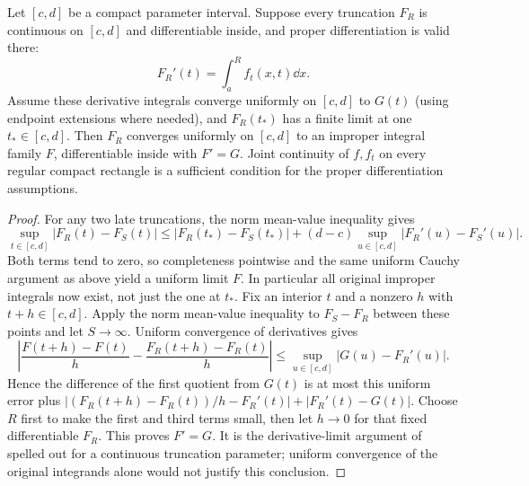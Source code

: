 \begin{theorem}
Let $[c,d]$ be a compact parameter interval. Suppose every truncation
$F_R$ is continuous on $[c,d]$ and differentiable inside, and proper
differentiation is valid there:
\[F_R'(t)=\int_a^R f_t(x,t)\dd x.
\]
Assume these derivative integrals converge uniformly on $[c,d]$ to
$G(t)$ (using endpoint extensions where needed), and $F_R(t_*)$ has a
finite limit at one $t_*\in[c,d]$. Then $F_R$ converges uniformly on
$[c,d]$ to an improper integral family $F$, differentiable inside with
$F'=G$. Joint continuity of $f,f_t$ on every regular compact rectangle
is a sufficient condition for the proper differentiation assumptions.
\end{theorem}
\begin{proof}
For any two late truncations, the norm mean-value inequality gives
\[\sup_{t\in[c,d]}|F_R(t)-F_S(t)|
\le|F_R(t_*)-F_S(t_*)|+(d-c)\sup_{u\in[c,d]}|F_R'(u)-F_S'(u)|.
\]
Both terms tend to zero, so completeness pointwise and the same uniform
Cauchy argument as above yield a uniform limit $F$. In particular all
original improper integrals now exist, not just the one at $t_*$.
Fix an interior $t$ and a nonzero $h$ with $t+h\in[c,d]$.
Apply the norm mean-value inequality to $F_S-F_R$ between these points
and let $S\to\infty$. Uniform convergence of derivatives gives
\[\left|\frac{F(t+h)-F(t)}h-
\frac{F_R(t+h)-F_R(t)}h\right|
\le\sup_{u\in[c,d]}|G(u)-F_R'(u)|.
\]
Hence the difference of the first quotient from $G(t)$ is at most this
uniform error plus
$|(F_R(t+h)-F_R(t))/h-F_R'(t)|+|F_R'(t)-G(t)|$.
Choose $R$ first to make the first and third terms small, then let
$h\to0$ for that fixed differentiable $F_R$. This proves $F'=G$.
It is the derivative-limit argument of 
spelled out for a continuous truncation parameter; uniform convergence
of the original integrands alone would not justify this conclusion.
\end{proof}

